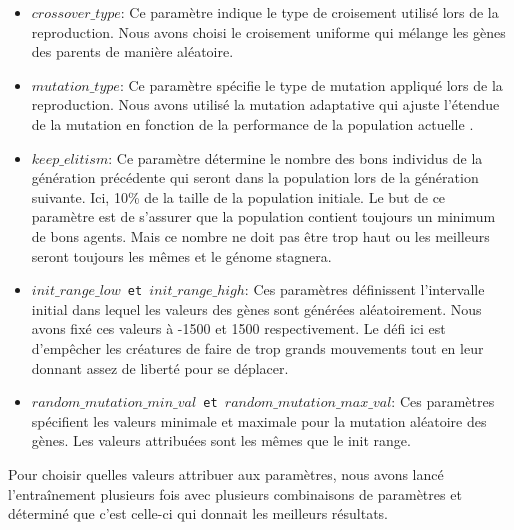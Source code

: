 \documentclass[journal, a4paper]{IEEEtran}
\begin{document}
\begin{itemize}
    \item \texttt{$crossover\_type$}: Ce paramètre indique le type de croisement utilisé lors de la reproduction. Nous avons choisi le croisement uniforme qui mélange les gènes des parents de manière aléatoire.
    \item \texttt{$mutation\_type$}: Ce paramètre spécifie le type de mutation appliqué lors de la reproduction. Nous avons utilisé la mutation adaptative qui ajuste l'étendue de la mutation en fonction de la performance de la population actuelle .
    \item \texttt{}{$keep\_elitism$}: Ce paramètre détermine le nombre des bons individus de la génération précédente qui seront dans la population  lors de la génération suivante. Ici, 10\% de la taille de la population initiale. Le but de ce paramètre est de s'assurer que la population contient toujours un minimum de bons agents. Mais ce nombre ne doit pas être trop haut ou les meilleurs seront toujours les mêmes et le génome stagnera.
    \item \texttt{$init\_range\_low$ et $init\_range\_high$}: Ces paramètres définissent l'intervalle initial dans lequel les valeurs des gènes sont générées aléatoirement. Nous avons fixé ces valeurs à -1500 et 1500 respectivement. Le défi ici est d'empêcher les créatures de faire de trop grands mouvements tout en leur donnant assez de liberté pour se déplacer.
    \item \texttt{$random\_mutation\_min\_val$ et $random\_mutation\_max\_val$}: Ces paramètres spécifient les valeurs minimale et maximale pour la mutation aléatoire des gènes. Les valeurs attribuées sont les mêmes que le init range.
\end{itemize}

Pour choisir quelles valeurs attribuer aux paramètres, nous avons lancé l'entraînement plusieurs fois avec plusieurs combinaisons de paramètres et déterminé que c'est celle-ci qui donnait les meilleurs résultats.




	
\end{document}
